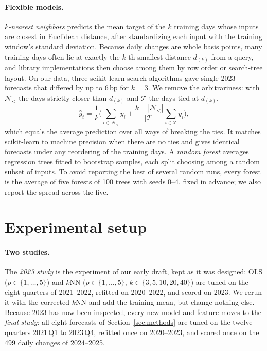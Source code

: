 \documentclass{article}
\begin{document}
\paragraph{Flexible models.} \emph{$k$-nearest neighbors} predicts the mean target of the $k$ training days whose inputs are closest in Euclidean distance, after standardizing each input with the training window's standard deviation. Because daily changes are whole basis points, many training days often lie at exactly the $k$-th smallest distance $d_{(k)}$ from a query, and library implementations then choose among them by row order or search-tree layout. On our data, three scikit-learn search algorithms gave single 2023 forecasts that differed by up to 6\,bp for $k=3$. We remove the arbitrariness: with $\mathcal N_{<}$ the days strictly closer than $d_{(k)}$ and $\mathcal T$ the days tied at $d_{(k)}$,
\begin{equation}
  \widehat y_t = \frac1k \Big( \sum_{i \in \mathcal N_{<}} y_i + \frac{k - |\mathcal N_{<}|}{|\mathcal T|} \sum_{i \in \mathcal T} y_i \Big),
  \label{eq:knn}
\end{equation}
which equals the average prediction over all ways of breaking the ties. It matches scikit-learn to machine precision when there are no ties and gives identical forecasts under any reordering of the training days. A \emph{random forest} \citep{breiman2001} averages regression trees fitted to bootstrap samples, each split choosing among a random subset of inputs. To avoid reporting the best of several random runs, every forest is the average of five forests of 100 trees with seeds 0--4, fixed in advance; we also report the spread across the five.

\section{Experimental setup}\label{sec:setup}
\paragraph{Two studies.} The \emph{2023 study} is the experiment of our early draft, kept as it was designed: OLS ($p \in \{1, \ldots, 5\}$) and $k$NN ($p \in \{1,\dots,5\}$, $k \in \{3, 5, 10, 20, 40\}$) are tuned on the eight quarters of 2021--2022, refitted on 2020--2022, and scored on 2023. We rerun it with the corrected $k$NN and add the training mean, but change nothing else. Because 2023 has now been inspected, every new model and feature moves to the \emph{final study}: all eight forecasts of Section~\ref{sec:methods} are tuned on the twelve quarters 2021\,Q1 to 2023\,Q4, refitted once on 2020--2023, and scored once on the 499 daily changes of 2024--2025.
\end{document}
